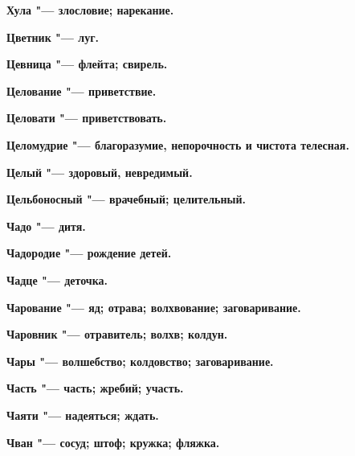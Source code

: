 \bfseries Хула \normalfont{} "--- злословие; нарекание. 




 





\bfseries Цветник \normalfont{} "--- луг. 




\bfseries Цевница \normalfont{} "--- флейта; свирель. 




\bfseries Целование \normalfont{} "--- приветствие. 




\bfseries Целовати \normalfont{} "--- приветствовать. 




\bfseries Целомудрие \normalfont{} "--- благоразумие, непорочность и чистота телесная. 




\bfseries Целый \normalfont{} "--- здоровый, невредимый. 




\bfseries Цельбоносный \normalfont{} "--- врачебный; целительный. 




 





\bfseries Чадо \normalfont{} "--- дитя. 




\bfseries Чадородие \normalfont{} "--- рождение детей. 




\bfseries Чадце \normalfont{} "--- деточка. 




\bfseries Чарование \normalfont{} "--- яд; отрава; волхвование; заговаривание. 




\bfseries Чаровник \normalfont{} "--- отравитель; волхв; колдун. 




\bfseries Чары \normalfont{} "--- волшебство; колдовство; заговаривание. 




\bfseries Часть \normalfont{} "--- часть; жребий; участь. 




\bfseries Чаяти \normalfont{} "--- надеяться; ждать. 




\bfseries Чван \normalfont{} "--- сосуд; штоф; кружка; фляжка. 




